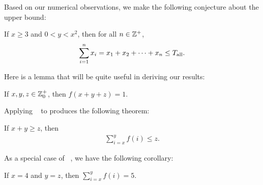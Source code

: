 Based on our numerical observations, we make the following conjecture about the upper bound:

\begin{Thm:Conjecture}
If \mbox{$x\geq 3$} and \mbox{$0<y<x^2$}, then for all \mbox{$n\in{\mathbb{Z}}^+$},
\[
\sum_{i=1}^{n} x_i
= x_1 + x_2 + \cdots + x_n
\leq T_{\textup{all}}.
\]
\end{Thm:Conjecture}

Here is a lemma that will be quite useful in deriving our results:

\begin{Thm:Lemma}
\label{Thm:Lemma:ChapAbbr:LemmaExampleA}
If \mbox{$x,y,z\in{\mathbb{Z}}^+_0$}, then \mbox{$f(x+y+z) = 1$}.
\end{Thm:Lemma}

Applying \Lemma~ to \cite[Theorem~4.2]{IEEEexample:book_typical} produces the following theorem:

\begin{Thm:Theorem}
\label{Thm:Theorem:ChapAbbr:TheoremExample}
If \mbox{$x+y\geq z$}, then
\begin{align*}
\sum_{i=x}^{y} f(i) \leq z.
\end{align*}
\end{Thm:Theorem}

As a special case of \Theorem~, we have the following corollary:

\begin{Thm:Corollary}
If \mbox{$x=4$} and \mbox{$y=z$}, then \mbox{$\sum_{i=x}^{y} f(i) = 5$}.
\end{Thm:Corollary}

\lipsum[13]


